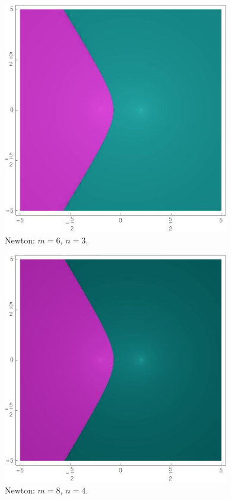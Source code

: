 \begin{figure}[H]
\vspace{0.5cm}

\begin{minipage}[t]{0.4\textwidth}
\centering
\includegraphics[width=0.88\textwidth]{fuentes/articulo-cuadraticos/imagenes/newton_m_6n_3.jpg}
\small Newton: $m=6, \, n=3.$
\end{minipage}\hfill
\begin{minipage}[t]{0.4\textwidth}
\centering
\includegraphics[width=0.88\textwidth]{fuentes/articulo-cuadraticos/imagenes/newton_m_8n_4.jpg}
\small Newton: $m=8, \, n=4.$
\end{minipage}


\end{figure}
